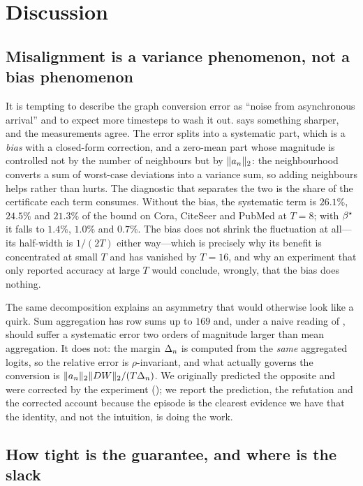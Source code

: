 \section{Discussion}
\label{sec:discussion}

\subsection{Misalignment is a variance phenomenon, not a bias phenomenon}
\label{sec:variance}

It is tempting to describe the graph conversion error as ``noise from asynchronous arrival'' and to
expect more timesteps to wash it out.  says something sharper, and the measurements
agree. The error splits into a systematic part, which is a \emph{bias} with a closed-form correction,
and a zero-mean part whose magnitude is controlled not by the number of neighbours but by $\lVert a_{n}\rVert_{2}$:
the neighbourhood converts a sum of worst-case deviations into a variance sum, so adding neighbours
helps rather than hurts. The diagnostic that separates the two is the share of the certificate each
term consumes. Without the bias, the systematic term is $26.1\%$, $24.5\%$ and $21.3\%$ of the bound
on Cora, CiteSeer and PubMed at $T=8$; with $\beta^{\star}$ it falls to $1.4\%$, $1.0\%$ and $0.7\%$. The
bias does not shrink the fluctuation at all---its half-width is $1/(2T)$ either way---which is
precisely why its benefit is concentrated at small $T$ and has vanished by $T=16$, and why an
experiment that only reported accuracy at large $T$ would conclude, wrongly, that the bias does
nothing.

The same decomposition explains an asymmetry that would otherwise look like a quirk. Sum aggregation
has row sums up to $169$ and, under a naive reading of , should suffer a systematic
error two orders of magnitude larger than mean aggregation. It does not: the margin $\Delta_{n}$ is
computed from the \emph{same} aggregated logits, so the relative error is $\rho$-invariant, and what
actually governs the conversion is $\lVert a_{n}\rVert_{2}\lVert DW\rVert_{2}/(T\Delta_{n})$. We originally predicted
the opposite and were corrected by the experiment (); we report the
prediction, the refutation and the corrected account because the episode is the clearest evidence we
have that the identity, and not the intuition, is doing the work.

\subsection{How tight is the guarantee, and where is the slack}
\label{sec:tight}

